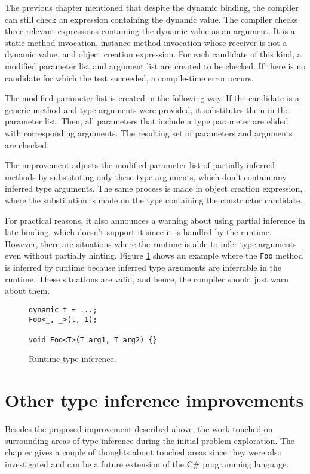 The previous chapter mentioned that despite the dynamic binding, the compiler can still check an expression containing the dynamic value. 
The compiler checks three relevant expressions containing the dynamic value as an argument. 
It is a static method invocation, instance method invocation whose receiver is not a dynamic value, and object creation expression. 
For each candidate of this kind, a modified parameter list and argument list are created to be checked. 
If there is no candidate for which the test succeeded, a compile-time error occurs.
\par
The modified parameter list is created in the following way. 
If the candidate is a generic method and type arguments were provided, it substitutes them in the parameter list. 
Then, all parameters that include a type parameter are elided with corresponding arguments. 
The resulting set of parameters and arguments are checked.
\par
The improvement adjusts the modified parameter list of partially inferred methods by substituting only these type arguments, which don’t contain any inferred type arguments. 
The same process is made in object creation expression, where the substitution is made on the type containing the constructor candidate.
\par
For practical reasons, it also announces a warning about using partial inference in late-binding, which doesn’t support it since it is handled by the runtime. 
However, there are situations where the runtime is able to infer type arguments even without partially hinting. 
Figure \ref{img63:dinamic} shows an example where the \texttt{Foo} method is inferred by runtime because inferred type arguments are inferrable in the runtime. 
These situations are valid, and hence, the compiler should just warn about them.
\begin{figure}[h!]
\begin{lstlisting}[style=csharp, mathescape=true]
dynamic t = ...;
Foo<_, _>(t, 1);

void Foo<T>(T arg1, T arg2) {}
\end{lstlisting}
\caption{Runtime type inference.}
\label{img63:dinamic}
\end{figure}

\section{Other type inference improvements}

Besides the proposed improvement described above, the work touched on surrounding areas of type inference during the initial problem exploration. 
The chapter gives a couple of thoughts about touched areas since they were also investigated and can be a future extension of the C\# programming language.

